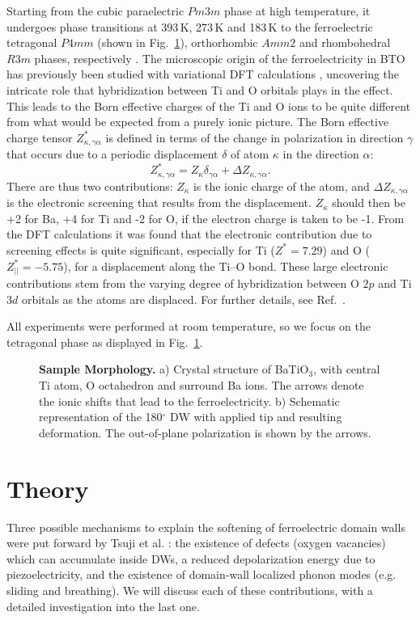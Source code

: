 Starting from the cubic paraelectric $Pm3m$ phase at high temperature, it undergoes phase transitions at 393\,K, 273\,K and 183\,K to the ferroelectric tetragonal $P4mm$ (shown in Fig.~\ref{fig:BTO_crystal}), orthorhombic $Amm2$ and rhombohedral $R3m$ phases, respectively \cite{Mason1948, VonHippel1950, Marton2010}.
The microscopic origin of the ferroelectricity in BTO has previously been studied with variational DFT calculations \cite{Ghosez1995}, uncovering the intricate role that hybridization between Ti and O orbitals plays in the effect.
This leads to the Born effective charges of the Ti and O ions to be quite different from what would be expected from a purely ionic picture.
The Born effective charge tensor $Z^*_{\kappa, \gamma\alpha}$ is defined in terms of the change in polarization in direction $\gamma$ that occurs due to a periodic displacement $\delta$ of atom $\kappa$ in the direction $\alpha$:
\begin{equation}
Z^*_{\kappa, \gamma\alpha} = Z_{\kappa} \delta_{\gamma\alpha} + \Delta Z_{\kappa, \gamma\alpha}.
\end{equation}
There are thus two contributions: $Z_{\kappa}$ is the ionic charge of the atom, and $\Delta Z_{\kappa, \gamma\alpha}$ is the electronic screening that results from the displacement.
$Z_{\kappa}$ should then be +2 for Ba, +4 for Ti and -2 for O, if the electron charge is taken to be -1.
From the DFT calculations it was found that the electronic contribution due to screening effects is quite significant, especially for Ti ($Z^* = 7.29$) and O ($Z^*_{||} = -5.75$), for a displacement along the Ti--O bond.
These large electronic contributions stem from the varying degree of hybridization between O $2p$ and Ti $3d$ orbitals as the atoms are displaced.
For further details, see Ref.~\cite{Ghosez1995}.

All experiments were performed at room temperature, so we focus on the tetragonal phase as displayed in Fig.~\ref{fig:BTO_crystal}.
\begin{figure}[h]
	\caption{\label{fig:BTO_crystal}{\bf Sample Morphology.} a) Crystal structure of BaTiO$_3$, with central Ti atom, O octahedron and surround Ba ions. The arrows denote the ionic shifts that lead to the ferroelectricity. b) Schematic representation of the 180$^\circ$ DW with applied tip and resulting deformation. The out-of-plane polarization is shown by the arrows.}
\end{figure}

\section{Theory}
Three possible mechanisms to explain the softening of ferroelectric domain walls were put forward by Tsuji et al. \cite{Tsuji2005}: the existence of defects (oxygen vacancies) which can accumulate inside DWs, a reduced depolarization energy due to piezoelectricity, and the existence of domain-wall localized phonon modes (e.g. sliding and breathing). We will discuss each of these contributions, with a detailed investigation into the last one.

